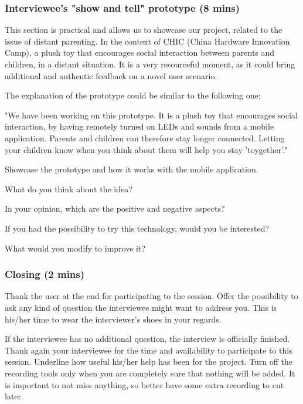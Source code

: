 \subsubsection{Interviewee's "show and tell" prototype (8 mins)}

This section is practical and allows us to showcase our project, related to the issue of distant parenting. In the context of CHIC (China Hardware Innovation Camp), a plush toy that encourages social interaction between parents and children, in a distant situation. It is a very resourceful moment, as it could bring additional and authentic feedback on a novel user scenario.

The explanation of the prototype could be similar to the following one:

"We have been working on this prototype. It is a plush toy that encourages social interaction, by having remotely turned on LEDs and sounds from a mobile application. Parents and children can therefore stay longer connected. Letting your children know when you think about them will help you stay 'toygether'\texttrademark."

Showcase the prototype and how it works with the mobile application.

\begin{todolist}
    \item What do you think about the idea?
    \item In your opinion, which are the positive and negative aspects?
    \item If you had the possibility to try this technology, would you be interested?
    \item What would you modify to improve it?
\end{todolist}

\vspace{2pt}
\subsubsection{Closing (2 mins)}

Thank the user at the end for participating to the session. Offer the possibility to ask any kind of question the interviewee might want to address you.  This is his/her time to wear the interviewer's shoes in your regards.

If the interviewee has no additional question, the interview is officially finished. Thank again your interviewee for the time and availability to participate to this session. Underline how useful his/her help has been for the project.
Turn off the recording tools only when you are completely sure that nothing will be added. It is important to not miss anything, so better have some extra recording to cut later.


